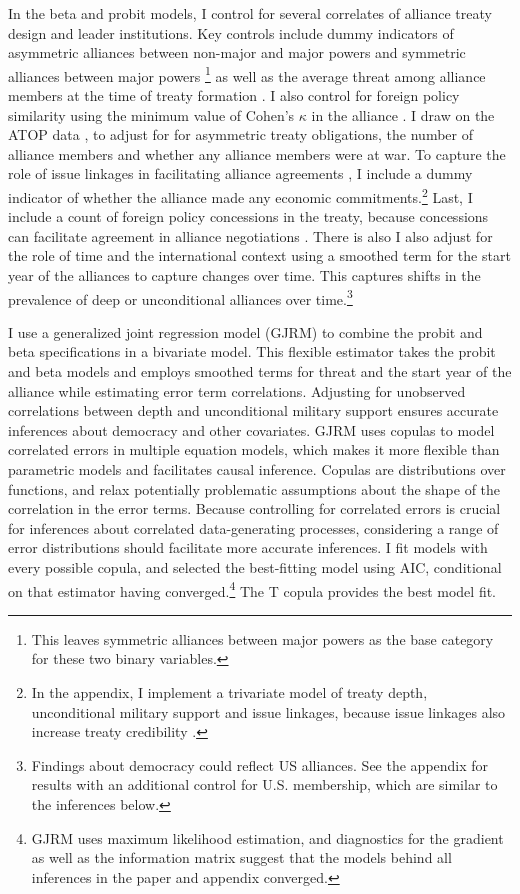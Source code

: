 \documentclass[12pt]{article}
\begin{document}
In the beta and probit models, I control for several correlates of alliance treaty design and leader institutions. 
Key controls include dummy indicators of asymmetric alliances between non-major and major powers and symmetric alliances between major powers \citep{Mattes2012}\footnote{This leaves symmetric alliances between major powers as the base category for these two binary variables.} as well as the average threat among alliance members at the time of treaty formation \citep{LeedsSavun2007}. 
I also control for foreign policy similarity using the minimum value of Cohen's $\kappa$ in the alliance \citep{Hage2011}.
I draw on the ATOP data \citep{Leedsetal2002}, to adjust for for asymmetric treaty obligations, the number of alliance members and whether any alliance members were at war. 
To capture the role of issue linkages in facilitating alliance agreements \citep{Poast2012}, I include a dummy indicator of whether the alliance made any economic commitments.\footnote{In the appendix, I implement a trivariate model of treaty depth, unconditional military support and issue linkages, because issue linkages also increase treaty credibility \citep{ Poast2013}.}  
Last, I include a count of foreign policy concessions in the treaty, because concessions can facilitate agreement in alliance negotiations \citep{Johnson2015}. 
There is also I also adjust for the role of time and the international context using a smoothed term for the start year of the alliances to capture changes over time.
This captures shifts in the prevalence of deep or unconditional alliances over time.\footnote{Findings about democracy could reflect US alliances. See the appendix for results with an additional control for U.S. membership, which are similar to the inferences below.}


I use a generalized joint regression model (GJRM) \citep{Braumoelleretal2018} to combine the probit and beta specifications in a bivariate model.
This flexible estimator takes the probit and beta models and employs smoothed terms for threat and the start year of the alliance while estimating error term correlations. 
Adjusting for unobserved correlations between depth and unconditional military support ensures accurate inferences about democracy and other covariates.
GJRM uses copulas to model correlated errors in multiple equation models, which makes it more flexible than parametric models and facilitates causal inference. 
Copulas are distributions over functions, and relax potentially problematic assumptions about the shape of the correlation in the error terms. 
Because controlling for correlated errors is crucial for inferences about correlated data-generating processes, considering a range of error distributions should facilitate more accurate inferences. 
I fit models with every possible copula, and selected the best-fitting model using AIC, conditional on that estimator having converged.\footnote{GJRM uses maximum likelihood estimation, and diagnostics for the gradient as well as the information matrix suggest that the models behind all inferences in the paper and appendix converged.} 
The T copula provides the best model fit. 
\end{document}
